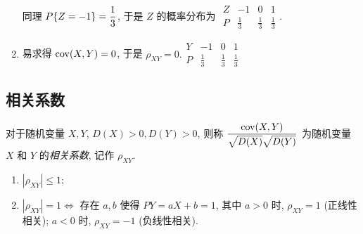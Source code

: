 \begin{solution}
\begin{minipage}{0.68\linewidth}
\begin{enumerate}[label=(\arabic{*})]
                  同理 $P\qty{Z=-1}=\dfrac{1}{3}$, 于是 $Z$ 的概率分布为 $\begin{array}{c|ccc}
                          Z & -1          & 0           & 1           \\\hline
                          P & \frac{1}{3} & \frac{1}{3} & \frac{1}{3}
                      \end{array}.$
            \item 易求得 $\mathrm{cov}(X,Y)=0$, 于是 $\rho_{XY}=0.\begin{array}{c|ccc}
                          Y & -1          & 0           & 1           \\\hline
                          P & \frac{1}{3} & \frac{1}{3} & \frac{1}{3}
                      \end{array}$
        \end{enumerate}
    \end{minipage}
\end{solution}

\subsection{相关系数}

\begin{definition}[相关系数]
    对于随机变量 $X,Y$, $D(X)>0,D(Y)>0$, 则称 $\dfrac{\mathrm{cov}(X,Y)}{\sqrt{D(X)}\sqrt{D(Y)}}$ 为随机变量 $X$ 和 $Y$ 的\textit{相关系数}, 记作 $\rho_{XY}$.
\end{definition}

\begin{theorem}[相关系数的性质]
    \begin{enumerate}[label=(\arabic{*})]
        \item $|\rho_{XY}|\leqslant 1$;
        \item $|\rho_{XY}|=1\Leftrightarrow $ 存在 $a,b$ 使得 $P{Y=aX+b}=1$, 其中 $a>0$ 时, $\rho_{XY}=1$ (正线性相关); $a<0$ 时, $\rho_{XY}=-1$ (负线性相关).
    \end{enumerate}
\end{theorem}

